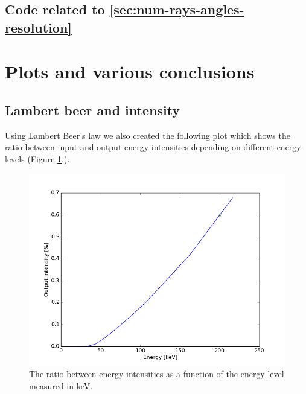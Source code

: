 \documentclass{article}
\begin{document}
\subsection{Code related to \ref{sec:num-rays-angles-resolution}}\label{appendix:num-rays-angles-resolution}


\newpage

\section{Plots and various conclusions}
\subsection{Lambert beer and intensity}
Using Lambert Beer's law we also created the following plot which shows the ratio between input and output energy intensities depending on different energy levels (Figure \ref{fig:energy-vs-output-percentage}.). 

\begin{figure}[H]
    \centering
    \includegraphics[scale=0.35]{images/energy-vs-output-percentage.png}
    \caption{The ratio between energy intensities as a function of the energy level measured in keV.}
    \label{fig:energy-vs-output-percentage}
\end{figure}
\end{document}

